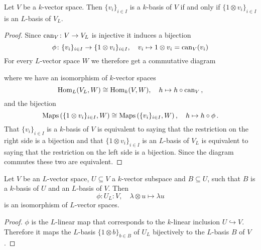 \begin{lemma}
  Let $V$ be a $k$-vector space.
  Then $\{v_i\}_{i \in I}$ is a $k$-basis of $V$ if and only if $\{1 \otimes v_i\}_{i \in I}$ is an $L$-basis of $V_L$.
\end{lemma}
\begin{proof}
  Since $\operatorname{can}_V \colon V \to V_L$ is injective it induces a bijection
  \[
            \phi
    \colon  \{v_i\}_{i \in I}
    \to     \{1 \otimes v_i\}_{i \in I},
    \quad   v_i
    \mapsto 1 \otimes v_i
    =       \operatorname{can}_V(v_i)
  \]
  For every $L$-vector space $W$ we therefore get a commutative diagram
  \begin{center}
  \end{center}
  where we have an isomorphism of $k$-vector spaces
  \[
            \operatorname{Hom}_L(V_L, W)
    \cong   \operatorname{Hom}_k(V, W),
    \quad   h
    \mapsto h \circ \operatorname{can}_V \,,
  \]
  and the bijection
  \[
          \operatorname{Maps}\left( \{1 \otimes v_i\}_{i \in I}, W \right)
    \cong \operatorname{Maps}\left( \{v_i\}_{i \in I} ,W \right),
    \quad   h
    \mapsto h \circ \phi \,.
  \]
  That $\{v_i\}_{i \in I}$ is a $k$-basis of $V$ is equivalent to saying that the restriction on the right side is a bijection and that $\{1 \otimes v_i\}_{i \in I}$ is an $L$-basis of $V_L$ is equivalent to saying that the restriction on the left side is a bijection.
  Since the diagram commutes these two are equivalent.
\end{proof}


\begin{corollary}\label{corollary: inclusion to bijection vector spaces}
  Let $V$ be an $L$-vector space, $U \subseteq V$ a $k$-vector subspace and $B \subseteq U$, such that $B$ is a $k$-basis of $U$ and an $L$-basis of $V$.
  Then
  \[
            \phi
    \colon  U_L
    \colon  V,
    \quad   \lambda \otimes u
    \mapsto \lambda u
  \]
  is an isomorphism of $L$-vector spaces.
\end{corollary}
\begin{proof}
  $\phi$ is the $L$-linear map that corresponds to the $k$-linear inclusion $U \hookrightarrow V$.
  Therefore it maps the $L$-basis $\{1 \otimes b\}_{b \in B}$ of $U_L$ bijectively to the $L$-basis $B$ of $V$.
\end{proof}


